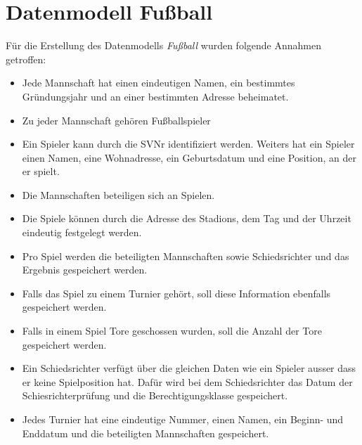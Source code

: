 \section{Datenmodell Fußball}
\pra

\noindent
Für die Erstellung des Datenmodells \textit{Fußball} wurden folgende Annahmen getroffen:

\begin{itemize}
	\item Jede Mannschaft hat einen eindeutigen Namen, ein bestimmtes Gründungsjahr und an einer bestimmten Adresse beheimatet.
	\item Zu jeder Mannschaft gehören Fußballspieler
	\item Ein Spieler kann durch die SVNr identifiziert werden. Weiters hat ein Spieler einen Namen, eine Wohnadresse, ein Geburtsdatum und eine Position, an der er spielt.
	\item Die Mannschaften beteiligen sich an Spielen. 
	\item Die Spiele können durch die Adresse des Stadions, dem Tag und der Uhrzeit eindeutig festgelegt werden.
	\item Pro Spiel werden die beteiligten Mannschaften sowie Schiedsrichter und das Ergebnis gespeichert werden.
	\item Falls das Spiel zu einem Turnier gehört, soll diese Information ebenfalls gespeichert werden.
	\item Falls in einem Spiel Tore geschossen wurden, soll die Anzahl der Tore gespeichert werden.
	\item Ein Schiedsrichter verfügt über die gleichen Daten wie ein Spieler ausser dass er keine Spielposition hat. Dafür wird bei dem Schiedsrichter das Datum der Schiesrichterprüfung und die Berechtigungsklasse gespeichert.
	\item Jedes Turnier hat eine eindeutige Nummer, einen Namen, ein Beginn- und Enddatum und die beteiligten Mannschaften gespeichert.
\end{itemize}